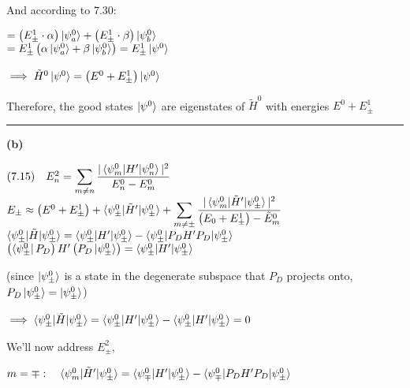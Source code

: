 \documentclass[14pt]{extarticle}
\makeatletter
\newenvironment{lefteqs}{%
    \begin{flushleft}%
    \renewcommand{\arraystretch}{1.3}%
    $\begin{array}{@{}l@{}}%
}{%
    \end{array}$%
    \end{flushleft}%
}
\makeatother
\begin{document}
And according to 7.30:

\begin{lefteqs}
    = \left( E^1_{\pm} \cdot \alpha \right) \ket{\psi^0_a} + \left( E^1_{\pm} \cdot \beta \right) \ket{\psi^0_b} \\
    = E^1_{\pm} \left( \alpha \ket{\psi^0_a} + \beta \ket{\psi^0_b} \right) = E^1_{\pm} \ket{\psi^0}
\end{lefteqs}

\begin{lefteqs}
    \implies \tilde{H}^0 \ket{\psi^0} = \left( E^0 + E^1_{\pm} \right) \ket{\psi^0}
\end{lefteqs}

Therefore, the good states $\ket{\psi^0}$ are eigenstates of $\tilde{H}^0$ with energies $E^0 + E^1_{\pm}$

\vspace{3em}
\hrule
\vspace{2em}

\textbf{(b)}
\begin{lefteqs}
    \text{(7.15)} \quad E^2_n = \displaystyle \sum_{m \neq n} \frac{|\braket{\psi^0_m | H' | \psi^0_n}|^2}{E^0_n - E^0_m} \\
    E_{\pm} \approx \left( E^0 + E^1_{\pm} \right) + \braket{\psi^0_{\pm} | \tilde{H}' | \psi^0_{\pm}} + \displaystyle \sum_{m \neq \pm} \frac{|\braket{\psi^0_m | \tilde{H}' | \psi^0_{\pm}}|^2}{\left( E_0 + E^1_{\pm} \right) - \tilde{E}^0_m} \\
    \braket{\psi^0_{\pm} | \tilde{H} | \psi^0_{\pm}} = \braket{\psi^0_{\pm} | H' | \psi^0_{\pm}} - \braket{\psi^0_{\pm} | P_D H' P_D | \psi^0_{\pm}} \\
    \left( \bra{\psi^0_{\pm}} P_D \right) H' \left( P_D \ket{\psi^0_{\pm}} \right) = \braket{\psi^0_{\pm} | H' | \psi^0_{\pm}}
\end{lefteqs}

(since $\ket{\psi^0_{\pm}}$ is a state in the degenerate subspace that $P_D$ projects onto, $P_D \ket{\psi^0_{\pm}} = \ket{\psi^0_{\pm}}$)

\begin{lefteqs}
    \implies \braket{\psi^0_{\pm} | \tilde{H} | \psi^0_{\pm}} = \braket{\psi^0_{\pm} | H' | \psi^0_{\pm}} - \braket{\psi^0_{\pm} | H' | \psi^0_{\pm}} = 0
\end{lefteqs}

We'll now address $E^2_{\pm}$,

\begin{lefteqs}
    m = \mp : \quad \braket{\psi^0_m | \tilde{H}' | \psi^0_{\pm}} = \braket{\psi^0_{\mp} | H' | \psi^0_{\pm}} - \braket{\psi^0_{\mp} | P_D H' P_D | \psi^0_{\pm}}
\end{lefteqs}
\end{document}
